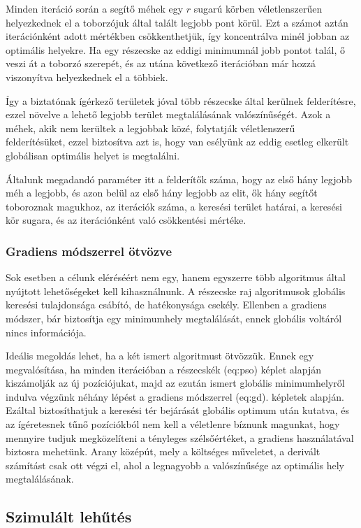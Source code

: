 Minden iteráció során a segítő méhek egy $r$ sugarú körben véletlenszerűen helyezkednek el a toborzójuk által talált legjobb pont körül. Ezt a számot aztán iterációnként adott mértékben csökkenthetjük, így koncentrálva minél jobban az optimális helyekre. Ha egy részecske az eddigi minimumnál jobb pontot talál, ő veszi át a toborzó szerepét, és az utána következő iterációban már hozzá viszonyítva helyezkednek el a többiek.

Így a biztatónak ígérkező területek jóval több részecske által kerülnek felderítésre, ezzel növelve a lehető legjobb terület megtalálásának valószínűségét. Azok a méhek, akik nem kerültek a legjobbak közé, folytatják véletlenszerű felderítésüket, ezzel biztosítva azt is, hogy van esélyünk az eddig esetleg elkerült globálisan optimális helyet is megtalálni.

Általunk megadandó paraméter itt a felderítők száma, hogy az első hány legjobb méh a legjobb, és azon belül az első hány legjobb az elit, ők hány segítőt toboroznak magukhoz, az iterációk száma, a keresési terület határai, a keresési kör sugara, és az iterációnként való csökkentési mértéke.

\subsubsection{Gradiens módszerrel ötvözve}

Sok esetben a célunk eléréséért nem egy, hanem egyszerre több algoritmus által nyújtott lehetőségeket kell kihasználnunk. A részecske raj algoritmusok globális keresési tulajdonsága csábító, de hatékonysága csekély. Ellenben a gradiens módszer, bár biztosítja egy minimumhely megtalálását, ennek globális voltáról nincs információja.

Ideális megoldás lehet, ha a két ismert algoritmust ötvözzük. Ennek egy megvalósítása, ha minden iterációban a részecskék \aref({eq:pso}) képlet alapján kiszámolják az új pozíciójukat, majd az ezután ismert globális minimumhelyről indulva végzünk néhány lépést a gradiens módszerrel \aref({eq:gd}). képletek alapján. Ezáltal biztosíthatjuk a keresési tér bejárását globális optimum után kutatva, és az ígéretesnek tűnő pozíciókból nem kell a véletlenre bíznunk magunkat, hogy mennyire tudjuk megközelíteni a tényleges szélsőértéket, a gradiens használatával biztosra mehetünk. Arany középút, mely a költséges műveletet, a derivált számítást csak ott végzi el, ahol a legnagyobb a valószínűsége az optimális hely megtalálásának.

\subsection{Szimulált lehűtés}

